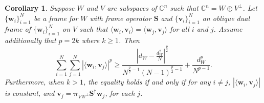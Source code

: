 \documentclass{amsart}
\numberwithin{equation}{section}
\newcommand{\bpi}{{\boldsymbol{\pi}}}
\theoremstyle{plain}
\newtheorem{corollary}[theorem]{Corollary}
\theoremstyle{remark}
\theoremstyle{definition}
\begin{document}
\begin{corollary}\label{coro:pPotential}
Suppose $W$ and $V$ are subspaces of $\mathbb{C}^n$ such that $\mathbb{C}^n = W \oplus V^\perp$. Let $\{\mathbf{w}_i\}_{i=1}^N$ be a frame for $W$ with frame operator $\mathbf{S}$ and $\{\mathbf{v}_i\}_{i=1}^N$ an oblique dual frame of $\{\mathbf{w}_i\}_{i=1}^N$ on $V$ such that $\langle \mathbf{w}_i, \mathbf{v}_i \rangle = \langle \mathbf{w}_j, \mathbf{v}_j \rangle$ for all $i$ and $j$.
Assume additionally that $p=2k$ where $k \geq 1$. Then 
    \begin{equation*}
        \sum_{i=1}^N \sum_{j=1}^N |\langle \mathbf{w}_i, \mathbf{v}_j \rangle |^p \geq \frac{|d_W - \frac{d_W^2}{N} |^{\frac{p}{2}}}{N^{{\frac{p}{2}}-1}(N-1)^{\frac{p}{2}-1}} + \frac{d_W^p}{N^{p-1}}. 
    \end{equation*}
Furthermore, when $k > 1$, the equality holds if and only if for any $i \neq j$, $|\langle \mathbf{w}_i, \mathbf{v}_j \rangle |$ is constant, and $\mathbf{v}_j = \bpi_{VW^\perp} \mathbf{S}^\dagger \mathbf{w}_j$, for each $j$. 
\end{corollary}
\end{document}
